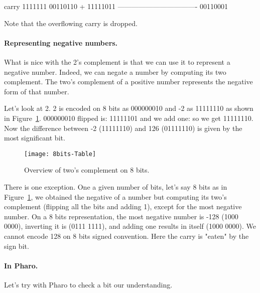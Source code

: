 \documentclass[a4paper,10pt,twoside]{book}
\begin{document}
\begin{code}{}
carry	1111111 
		 00110110
+		 11111011	
	----------------------------------
		 00110001	
\end{code}

Note that the overflowing carry is dropped.

\paragraph{Representing negative numbers.}
What is nice with the 2's complement is that we can use it to represent a negative number. Indeed, we can negate a number by computing its two complement. The two's complement of a positive number represents the negative form of that number.

Let's look at 2. 2 is encoded on 8 bits as 000000010 and -2 as 11111110 as shown in Figure~\ref{negativePositive}.
000000010 flipped is: 11111101 and we add one: so we get 11111110.
Now the difference between  -2 (11111110) and 126 (01111110) is given by the most significant bit. 

\begin{figure}[h]
\begin{center}
\texttt{[image: 8bits-Table]}
\caption{Overview of two's complement on 8 bits.\label{negativePositive}}
\end{center}
\end{figure}


There is one exception. One a given number of bits, let's say 8 bits as in Figure~\ref{negativePositive},
we obtained the negative of a number but computing its two's complement (flipping all the bits and adding 1), except for the most negative number. On a 8 bits representation, the most negative number is -128 (1000 0000), inverting it is (0111 1111), and adding one results in itself (1000 0000). We cannot encode 128 on 8 bits signed convention. Here the carry is "eaten" by the sign bit. 


\paragraph{In Pharo.}
Let's try with Pharo to check a bit our understanding. 

%
\end{document}
